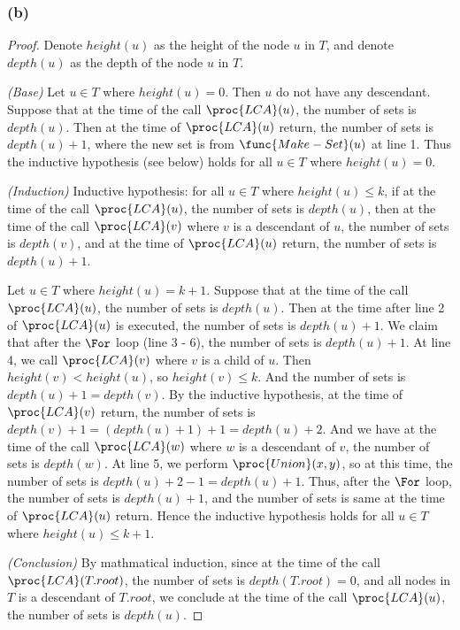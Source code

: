 \subsubsection*{(b)}

\begin{proof}
    Denote $height(u)$ as the height of the node $u$ in $T$,
    and denote $depth(u)$ as the depth of the node $u$ in $T$.

    \textit{(Base)}
    Let $u \in T$ where $height(u) = 0$.
    Then $u$ do not have any descendant.
    Suppose that at the time of the call $\proc{LCA}(u)$, the number of sets is $depth(u)$.
    Then at the time of $\proc{LCA}(u)$ return, the number of sets is $depth(u) + 1$,
    where the new set is from $\func{Make-Set}(u)$ at line 1.
    Thus the inductive hypothesis (see below) holds for all $u \in T$ where $height(u) = 0$.

    \textit{(Induction)}
    Inductive hypothesis: for all $u \in T$ where $height(u) \leq k$, 
    if at the time of the call $\proc{LCA}(u)$, the number of sets is $depth(u)$,
    then at the time of the call $\proc{LCA}(v)$ where $v$ is a descendant of $u$, 
    the number of sets is $depth(v)$, 
    and at the time of $\proc{LCA}(u)$ return, the number of sets is $depth(u) + 1$.

    Let $u \in T$ where $height(u) = k + 1$.
    Suppose that at the time of the call $\proc{LCA}(u)$, the number of sets is $depth(u)$.
    Then at the time after line 2 of $\proc{LCA}(u)$ is executed, 
    the number of sets is $depth(u) + 1$.
    We claim that after the $\For$ loop (line 3 - 6),
    the number of sets is $depth(u) + 1$.
    At line 4, we call $\proc{LCA}(v)$ where $v$ is a child of $u$.
    Then $height(v) < height(u)$, so $height(v) \leq k$.
    And the number of sets is $depth(u) + 1 = depth(v)$.
    By the inductive hypothesis, at the time of $\proc{LCA}(v)$ return, 
    the number of sets is $depth(v) + 1 = (depth(u) + 1) + 1 = depth(u) + 2$.
    And we have at the time of the call $\proc{LCA}(w)$ where $w$ is a descendant of $v$, 
    the number of sets is $depth(w)$.
    At line 5, we perform $\proc{Union}(x,y)$, so at this time, 
    the number of sets is $depth(u) + 2 - 1 = depth(u) + 1$.
    Thus, after the $\For$ loop,
    the number of sets is $depth(u) + 1$,
    and the number of sets is same at the time of $\proc{LCA}(u)$ return.
    Hence the inductive hypothesis holds for all $u \in T$ where $height(u) \leq k + 1$.

    \textit{(Conclusion)}
    By mathmatical induction, 
    since at the time of the call $\proc{LCA}(T.root)$, the number of sets is $depth(T.root) = 0$,
    and all nodes in $T$ is a descendant of $T.root$,
    we conclude at the time of the call $\proc{LCA}(u)$, the number of sets is $depth(u)$.
\end{proof}

